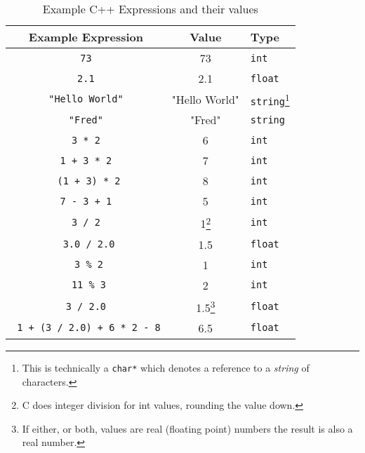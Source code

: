 \begin{table}[h]
  \begin{minipage}{\textwidth}
  \centering
  \begin{tabular}{|c|c|l|}
    \hline
    \textbf{Example Expression} & \textbf{Value} & \textbf{Type} \\
    \hline
    \texttt{ 73 }     &   73                 & \texttt{int}  \\
    \texttt{ 2.1 }      & 2.1   & \texttt{float}    \\
    \texttt{ "Hello World" }      &   "Hello World"    & \texttt{string}\footnote{This is technically a \texttt{char*} which denotes a reference to a \textit{string} of characters.}   \\
    \texttt{ "Fred" }      &   "Fred"    & \texttt{string}   \\
    \texttt{ 3 * 2 } & 6 & \texttt{int} \\
    \texttt{ 1 + 3 * 2 }  & 7 & \texttt{int} \\
    \texttt{ (1 + 3) * 2} & 8 & \texttt{int} \\
    \texttt{ 7 - 3 + 1 }  & 5 & \texttt{int} \\
    \texttt{ 3 / 2 } & 1\footnote{C does integer division for int values, rounding the value down.} & \texttt{int} \\
    \texttt{ 3.0 / 2.0} & 1.5 & \texttt{float} \\
    \texttt{ 3 \% 2} & 1 & \texttt{int} \\
    \texttt{ 11 \% 3} & 2 & \texttt{int} \\
    \texttt{ 3 / 2.0 } & 1.5\footnote{If either, or both, values are real (floating point) numbers the result is also a real number.} & \texttt{float} \\
    \texttt{ 1 + (3 / 2.0) + 6 * 2 - 8} & 6.5 & \texttt{float} \\
    \hline
  \end{tabular}
\end{minipage}
  \caption{Example C++ Expressions and their values}
  \label{tbl:program-creation-c example expresions}
\end{table}



